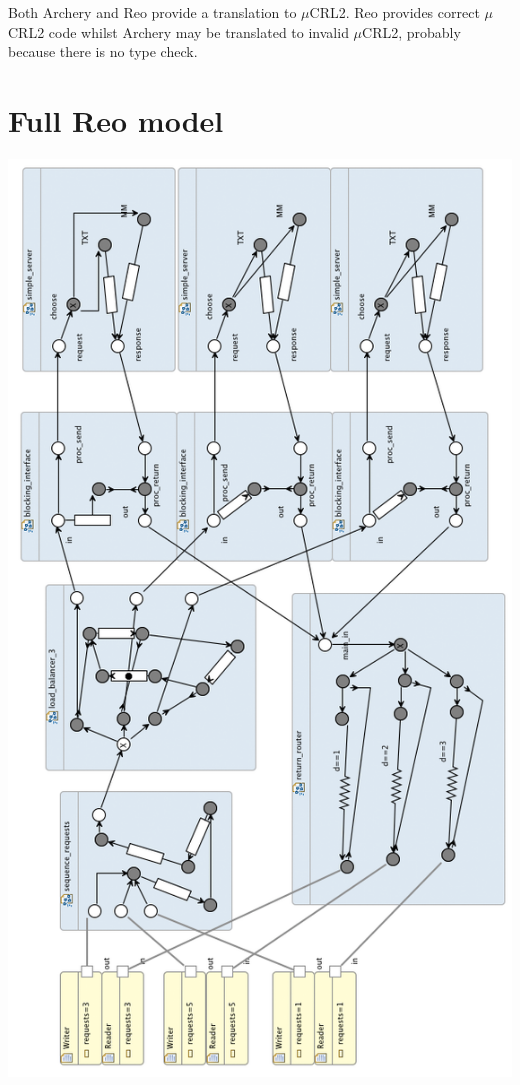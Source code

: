 \documentclass[a4paper]{article}
\newcommand{\ar}{Archery\xspace}
\newcommand{\re}{Reo\xspace}
\newcommand{\mcrl}{$\mu$CRL2\xspace}
\begin{document}
Both \ar and \re provide a translation to \mcrl. \re provides correct \mcrl
code whilst \ar may be translated to invalid \mcrl, probably because there is
no type check.



\appendix
\section{Full \re model}\label{app:reo}


    \begin{center}
        \includegraphics[height=0.95\textheight]{images/reo-full.png}
    \end{center}
\end{document}
